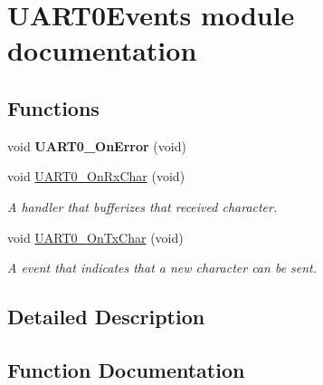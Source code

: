 \hypertarget{group___u_a_r_t0_events__module}{}\section{U\+A\+R\+T0\+Events module documentation}
\label{group___u_a_r_t0_events__module}
\subsection*{Functions}
\begin{DoxyCompactItemize}
\item 
\mbox{\label{group___u_a_r_t0_events__module_gae0867ff7f63463faa263d1d2ac567ec8}} 
void {\bfseries U\+A\+R\+T0\+\_\+\+On\+Error} (void)
\item 
void \hyperlink{group___u_a_r_t0_events__module_gabb812347b38dc208a03fb309a1978ed6}{U\+A\+R\+T0\+\_\+\+On\+Rx\+Char} (void)
\begin{DoxyCompactList}\small\item\em A handler that bufferizes that received character. \end{DoxyCompactList}\item 
void \hyperlink{group___u_a_r_t0_events__module_ga96b3fd9eb4bbaf0ad2eb012cd3738ed0}{U\+A\+R\+T0\+\_\+\+On\+Tx\+Char} (void)
\begin{DoxyCompactList}\small\item\em A event that indicates that a new character can be sent. \end{DoxyCompactList}\end{DoxyCompactItemize}


\subsection{Detailed Description}


\subsection{Function Documentation}
\mbox{\label{group___u_a_r_t0_events__module_gabb812347b38dc208a03fb309a1978ed6}} 
